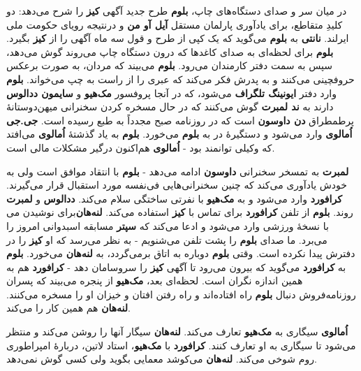 \documentclass[12pt]{book}
\newcommand{\noun}[1]{{\textbf{#1}}}
\begin{document}
    در میان سر و صدای دستگاه‌های چاپ، \noun{بلوم} طرح جدید آگهی \noun{کیز} را شرح می‌دهد: دو کلیدِ متقاطع، برای یادآوری پارلمان مستقل \noun{آیل آو من} و درنتیجه رویای حکومت ملی ایرلند. \noun{نانتی} به \noun{بلوم} می‌گوید که یک کپی از طرح و قول سه ماه آگهی را از \noun{کیز} بگیرد. \noun{بلوم} برای لحظه‌ای به صدای کاغدها که درون دستگاه چاپ می‌روند گوش می‌دهد، سپس به سمت دفتر کارمندان می‌رود. \noun{بلوم} می‌بیند که مردان، به صورت برعکس حروفچینی می‌کنند و به پدرش فکر می‌کند که عبری را از راست به چپ می‌خواند. \noun{بلوم} وارد دفتر \noun{ایونینگ تلگراف} می‌شود، که در آنجا پروفسور \noun{مک‌هیو} و \noun{سایمون ددالوس‬} دارند به \noun{ند لمبرت} گوش می‌کنند که در حال مسخره کردن سخنرانی میهن‌دوستانهٔ پرطمطراق \noun{دن داوسون} است که در روزنامه صبح مجدداً به طبع رسیده است. \noun{جی.جی اُمالوی} وارد می‌شود و دستگیرهٔ در به \noun{بلوم} می‌خورد. \noun{بلوم} به یاد گذشتهٔ \noun{اُمالوی} می‌افتد که وکیلی توانمند بود - \noun{اُمالوی} هم‌اکنون درگیر مشکلات مالی است.

    \noun{لمبرت} به تمسخر سخنرانی \noun{داوسون} ادامه می‌دهد - \noun{بلوم} با انتقاد موافق است ولی به خودش یادآوری می‌کند که چنین سخنرانی‌هایی فی‌نفسه مورد استقبال قرار می‌گیرند. \noun{کرافورد} وارد می‌شود و به \noun{مک‌هیو} با نفرتی ساختگی سلام می‌کند. \noun{ددالوس} و \noun{لمبرت} برای نوشیدن می‎‌روند. \noun{بلوم} از تلفن \noun{کرافورد} برای تماس با \noun{کیز} استفاده می‌کند. \noun{لنه‌هان} با نسخهٔ ورزشی وارد می‌شود و ادعا می‌کند که \noun{سپتر} مسابقه اسبدوانی امروز را می‌برد. ما صدای \noun{بلوم} را پشت تلفن می‌شنویم - به نظر می‌رسد که او \noun{کیز} را در دفترش پیدا نکرده است. وقتی \noun{بلوم} دوباره به اتاق برمی‌گردد، به \noun{لنه‌هان} می‌خورد. \noun{بلوم} به \noun{کرافورد} می‌گوید که بیرون می‌رود تا آگهی \noun{کیز} را سروسامان دهد - \noun{کرافورد} هم به همین اندازه نگران است. لحظه‌ای بعد، \noun{مک‌هیو} از پنجره می‌بیند که پسران روزنامه‌فروش دنبال \noun{بلوم} راه افتاده‌اند و راه رفتن افتان و خیزان او را مسخره می‌کنند. \noun{لنه‌هان} هم همین کار را می‌کند.

    \noun{اُمالوی} سیگاری به \noun{مک‌هیو} تعارف می‌کند. \noun{لنه‌هان} سیگار آنها را روشن می‌کند و منتظر می‌شود تا سیگاری به او تعارف کنند. \noun{کرافورد} با \noun{مک‌هیو}، استاد لاتین، دربارهٔ امپراطوری روم شوخی می‌کند. \noun{لنه‌هان} می‌کوشد معمایی بگوید ولی کسی گوش نمی‌دهد.
\end{document}
